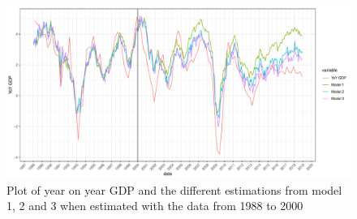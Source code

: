 \documentclass[12pt,a4paper,oneside]{book}
\begin{document}
\begin{figure}[H]
    \centering
    \includegraphics[scale=0.5]{Graphs/predictions2.pdf}
    \caption{Plot of year on year GDP and the different estimations from model 1, 2 and 3 when estimated with the data from 1988 to 2000}
    \label{fig:predictions2}
\end{figure}
\end{document}
